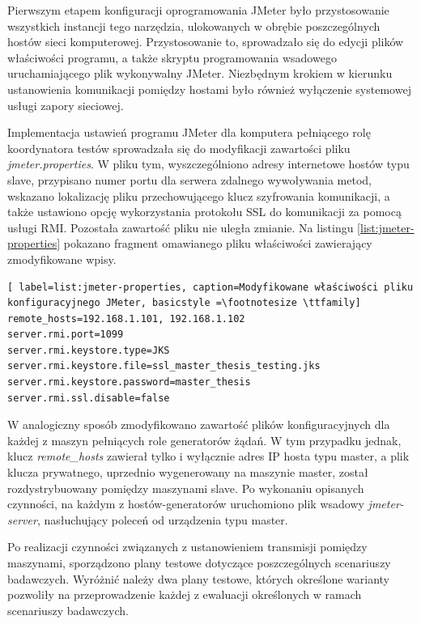 Pierwszym etapem konfiguracji oprogramowania JMeter było przystosowanie wszystkich instancji tego narzędzia, ulokowanych w obrębie poszczególnych hostów sieci komputerowej. Przystosowanie to, sprowadzało się do edycji plików właściwości programu, a także skryptu programowania wsadowego uruchamiającego plik wykonywalny JMeter. Niezbędnym krokiem w kierunku ustanowienia komunikacji pomiędzy hostami było również wyłączenie systemowej usługi zapory sieciowej.

Implementacja ustawień programu JMeter dla komputera pełniącego rolę koordynatora testów sprowadzała się do modyfikacji zawartości pliku \textit{jmeter.properties}. W pliku tym, wyszczególniono adresy internetowe hostów typu slave, przypisano numer portu dla serwera zdalnego wywoływania metod, wskazano lokalizację pliku przechowującego klucz szyfrowania komunikacji, a także ustawiono opcję wykorzystania protokołu SSL do komunikacji za pomocą usługi RMI. Pozostała zawartość pliku nie uległa zmianie. Na listingu \ref{list:jmeter-properties} pokazano fragment omawianego pliku właściwości zawierający zmodyfikowane wpisy.

\begin{lstlisting}[ label=list:jmeter-properties, caption=Modyfikowane właściwości pliku konfiguracyjnego JMeter, basicstyle =\footnotesize \ttfamily]
remote_hosts=192.168.1.101, 192.168.1.102
server.rmi.port=1099
server.rmi.keystore.type=JKS
server.rmi.keystore.file=ssl_master_thesis_testing.jks
server.rmi.keystore.password=master_thesis
server.rmi.ssl.disable=false
\end{lstlisting}

W analogiczny sposób zmodyfikowano zawartość plików konfiguracyjnych dla każdej z maszyn pełniących role generatorów żądań. W tym przypadku jednak, klucz \textit{remote\_hosts} zawierał tylko i wyłącznie adres IP hosta typu master, a plik klucza prywatnego, uprzednio wygenerowany na maszynie master, został rozdystrybuowany pomiędzy maszynami slave. Po wykonaniu opisanych czynności, na każdym z hostów-generatorów uruchomiono plik wsadowy \textit{jmeter-server}, nasłuchujący poleceń od urządzenia typu master.

Po realizacji czynności związanych z ustanowieniem transmisji pomiędzy maszynami, sporządzono plany testowe dotyczące poszczególnych scenariuszy badawczych. Wyróżnić należy dwa plany testowe, których określone warianty pozwoliły na przeprowadzenie każdej z ewaluacji określonych w ramach scenariuszy badawczych. 

